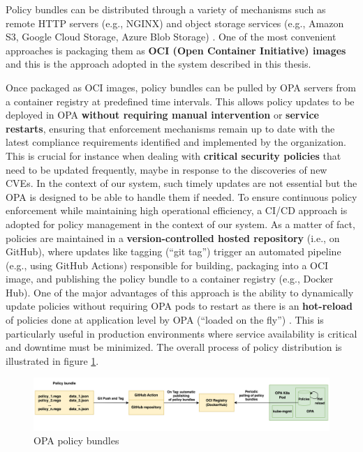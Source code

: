 Policy bundles can be distributed through a variety of mechanisms such as remote HTTP servers (e.g., NGINX) and object storage services (e.g., Amazon S3, Google Cloud Storage, Azure Blob Storage) \cite{opa_bundles}.
One of the most convenient approaches is packaging them as \textbf{OCI (Open Container Initiative) images} \cite{oci} and this is the approach adopted in the system described in this thesis.

Once packaged as OCI images, policy bundles can be pulled by OPA servers from a container registry at predefined time intervals. This allows policy updates to be deployed in OPA \textbf{without requiring manual intervention} or \textbf{service restarts}, ensuring that enforcement mechanisms remain up to date with the latest compliance requirements identified and implemented by the organization. This is crucial for instance when dealing with \textbf{critical security policies} that need to be updated frequently, maybe in response to the discoveries of new CVEs. In the context of our system, such timely updates are not essential but the OPA is designed to be able to handle them if needed.
To ensure continuous policy enforcement while maintaining high operational efficiency, a CI/CD approach is adopted for policy management in the context of our system.
As a matter of fact, policies are maintained in a \textbf{version-controlled hosted repository} (i.e., on GitHub), where updates like tagging (``git tag'') trigger an automated pipeline (e.g., using GitHub Actions) responsible for building, packaging into a OCI image, and publishing the policy bundle to a container registry (e.g., Docker Hub).
One of the major advantages of this approach is the ability to dynamically update policies without requiring OPA pods to restart as there is an \textbf{hot-reload} of policies done at application level by OPA (``loaded on the fly'') \cite{opa_bundles}. This is particularly useful in production environments where service availability is critical and downtime must be minimized. 
The overall process of policy distribution is illustrated in figure \ref{fig:opa_bundles}.

\begin{figure}[H]
\centering
\includegraphics[width=1\linewidth]{images/opa_bundles.png}
\caption{OPA policy bundles}
\label{fig:opa_bundles}
\end{figure}

